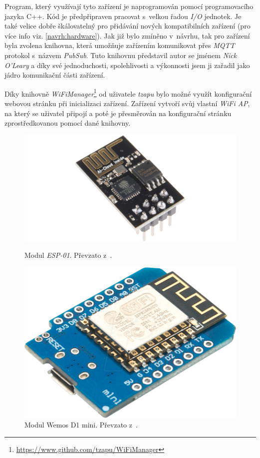 Program, který využívají tyto zařízení je naprogramován pomocí programovacího jazyka C++.
Kód je předpřipraven pracovat s~velkou řadou \emph{I/O} jednotek.
Je také velice dobře škálovatelný pro přidávání nových kompatibilních zařízení (pro více info viz. \ref{navrh:hardware}).
Jak již bylo zmíněno v~návrhu, tak pro zařízení byla zvolena knihovna, která umožňuje zařízením komunikovat přes \emph{MQTT} protokol s~názvem \emph{PubSub}.
Tuto knihovnu představil autor se jménem \emph{Nick O'Leary} a díky své jednoduchosti, spolehlivosti a výkonnosti jsem ji zařadil jako jádro komunikační části zařízení.

Díky knihovně \emph{WiFiManager}\footnote{\url{https://www.github.com/tzapu/WiFiManager}} od uživatele \emph{tzapu} bylo možné využít konfigurační webovou stránku při inicializaci zařízení.
Zařízení vytvoří svůj vlastní \emph{WiFi AP}, na který se uživatel připojí a poté je přesměrován na konfigurační stránku zprostředkovanou pomocí dané knihovny.

\begin{figure}[hbt]
  \centering
  \includegraphics[width=.8\linewidth]{obrazky-figures/esp-01.png}
  \caption{Modul \emph{ESP-01}. Převzato z~\cite{esp01}.}
  \label{figure:esp01}
  \endminipage

  \hfill
  \centering
  \includegraphics[width=.7\linewidth]{obrazky-figures/wemos.png}
  \caption{Modul Wemos D1 mini. Převzato z~\cite{wemosFigure}.}
  \label{figure:wemos}
  \endminipage
\end{figure}


